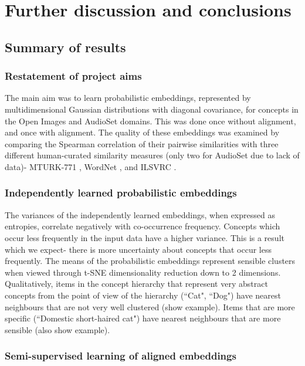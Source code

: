 \chapter{Further discussion and conclusions}


\section{Summary of results}

\subsection{Restatement of project aims}

The main aim was to learn probabilistic embeddings, represented by multidimensional Gaussian distributions with diagonal covariance, for concepts in the Open Images and AudioSet domains. This was done once without alignment, and once with alignment. The quality of these embeddings was examined by comparing the Spearman correlation of their pairwise similarities with three different human-curated similarity measures (only two for AudioSet due to lack of data)- MTURK-771 \cite{mturk771}, WordNet \cite{WordNet}, and ILSVRC \cite{RoadsLoveCVPR}. 

\subsection{Independently learned probabilistic embeddings}

The variances of the independently learned embeddings,  when expressed as entropies,  correlate negatively with co-occurrence frequency. Concepts which occur less frequently in the input data have a higher variance. This is a result which we expect- there is more uncertainty about concepts that occur less frequently. The means of the probabilistic embeddings represent sensible clusters when viewed through t-SNE dimensionality reduction down to 2 dimensions. Qualitatively, items in the concept hierarchy that represent very abstract concepts from the point of view of the hierarchy (``Cat", ``Dog") have nearest neighbours that are not very well clustered (show example). Items that are more specific (``Domestic short-haired cat")  have nearest neighbours that are more sensible (also show example). 

\subsection{Semi-supervised learning of aligned embeddings}

